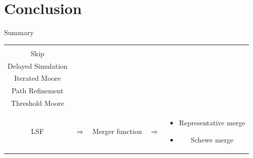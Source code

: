 \section*{Conclusion}
\begin{frame}{Summary}
\begin{tabular}{ccccc}
\begin{minipage}{0.32\textwidth}
	\begin{itemize}
	\item Moore \\
	\item Skip \\
	\item Delayed Simulation \\
	\item Iterated Moore \\
	\item Path Refinement \\
	\item Threshold Moore \\
	\item LSF
	\end{itemize}
\end{minipage}
&
$\Rightarrow$ 
&
\begin{minipage}{0.11\textwidth}
	Merger function
\end{minipage}
&
$\Rightarrow$
&
\begin{minipage}{0.3\textwidth}
	\begin{itemize}
	\item Representative merge
	\item Schewe merge
	\end{itemize}
\end{minipage}
\end{tabular}






\end{frame}










